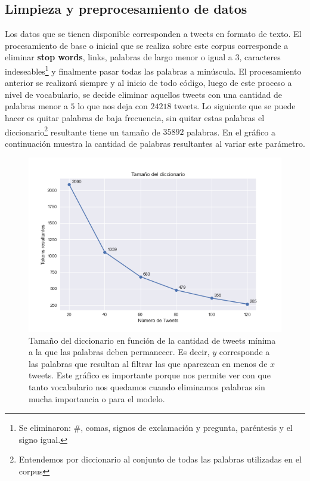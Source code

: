 \documentclass{article}
\begin{document}
\subsection{Limpieza y preprocesamiento de datos}
	Los datos que se tienen disponible corresponden a tweets en formato de texto. El procesamiento de base o inicial que se realiza sobre este corpus corresponde a eliminar \textbf{stop words}, links, palabras de largo menor o igual a $3$, caracteres indeseables\footnote{Se eliminaron: \#, comas, signos de exclamación y pregunta, paréntesis y el signo igual.} y finalmente pasar todas las palabras a minúscula. El procesamiento anterior se realizará siempre y al inicio de todo código, luego de este proceso a nivel de vocabulario, se decide eliminar aquellos tweets con una cantidad de palabras menor a $5$ lo que nos deja con $24218$ tweets. Lo siguiente que se puede hacer es quitar palabras de baja frecuencia, sin quitar estas palabras el diccionario\footnote{Entendemos por diccionario al conjunto de todas las palabras utilizadas en el corpus} resultante tiene un tamaño de $35892$ palabras. En el gráfico a continuación muestra la cantidad de palabras resultantes al variar este parámetro.
	
	\begin{figure}[H]
		\centering
		\includegraphics[scale=.5]{../imgs/no_below_len_dict.png}
		\caption{Tamaño del diccionario en función de la cantidad de tweets mínima a la que las palabras deben permanecer. Es decir, $y$ corresponde a las palabras que resultan al filtrar las que aparezcan en menos de $x$ tweets. Este gráfico es importante porque nos permite ver con que tanto vocabulario nos quedamos cuando eliminamos palabras sin mucha importancia o para el modelo.}
	\end{figure}
\end{document}
